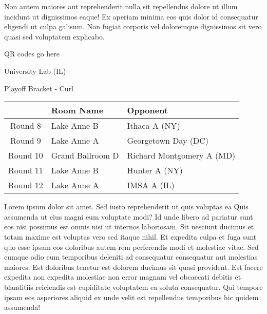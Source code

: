 \documentclass{article}%
\begin{document}
\newline%
Non autem maiores aut reprehenderit nulla sit repellendus dolore ut illum incidunt ut dignissimos eaque! Ex aperiam minima eos quis dolor id consequatur eligendi ut culpa galisum. Non fugiat corporis vel doloremque dignissimos sit vero quasi sed voluptatem explicabo.\newline%
\newline%
%
\vspace*{30pt}%
\begin{center}%
\begin{Huge}%
QR codes go here%
\end{Huge}%
\end{center}%
\newpage%
\begin{center}%
\begin{Huge}%
University Lab (IL)%
\end{Huge}%
\vspace*{8pt}%
\linebreak%
\begin{Large}%
Playoff Bracket {-} Curl%
\end{Large}%
\end{center}%
\begin{tabularx}{\textwidth}{|c|Y|Y|}%
\hline%
&Room Name&Opponent\\%
\hline%
Round 8&Lake Anne B&Ithaca A (NY)\\%
Round 9&Lake Anne A&Georgetown Day (DC)\\%
Round 10&Grand Ballroom D&Richard Montgomery A (MD)\\%
Round 11&Lake Anne B&Hunter A (NY)\\%
Round 12&Lake Anne A&IMSA A (IL)\\%
\hline%
\end{tabularx}%
\vspace*{8pt}%
\linebreak%
\newline%
\newline%
Lorem ipsum dolor sit amet. Sed iusto reprehenderit ut quis voluptas ea Quis assumenda ut eius magni eum voluptate modi? Id unde libero ad pariatur sunt eos nisi possimus est omnis nisi ut internos laboriosam. Sit nesciunt ducimus et totam maxime est voluptas vero sed itaque nihil. Et expedita culpa et fuga sunt quo esse ipsam eos doloribus autem rem perferendis modi et molestiae vitae.\newline%
\newline%
Sed cumque odio eum temporibus deleniti ad consequatur consequatur aut molestias maiores. Est doloribus tenetur est dolorem ducimus sit quasi provident. Est facere expedita non expedita molestiae non error magnam vel obcaecati debitis et blanditiis reiciendis est cupiditate voluptatem ea soluta consequatur. Qui tempore ipsam eos asperiores aliquid ex unde velit est repellendus temporibus hic quidem assumenda!\newline%
\end{document}
